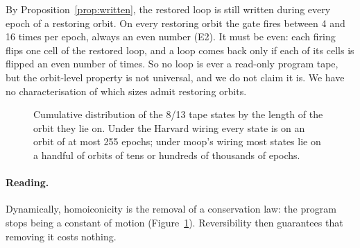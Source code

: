 \documentclass[11pt]{article}
\theoremstyle{definition}
\theoremstyle{remark}
\newcommand{\moop}{\textsf{moop}}
\begin{document}
By Proposition~\ref{prop:written}, the restored loop is still written
during every epoch of a restoring orbit. On every restoring orbit the gate
fires between 4 and 16 times per epoch, always an even number
(E2). It must be even: each firing flips one cell of the restored loop,
and a loop comes back only if each of its cells is flipped an even number
of times. So no loop is ever a read-only program tape, but the
orbit-level property is not universal, and we do not claim it is. We have
no characterisation of which sizes admit restoring orbits.

\begin{figure}[t]
\centering
{}
\caption{Cumulative distribution of the 8/13 tape states by the length
of the orbit they lie on. Under the Harvard wiring every state is on an
orbit of at most 255 epochs; under \moop{}'s wiring most states lie on a
handful of orbits of tens or hundreds of thousands of epochs.}
\label{fig:orbits}
\end{figure}

\paragraph{Reading.}
Dynamically, homoiconicity is the removal of a conservation law: the
program stops being a constant of motion (Figure~\ref{fig:orbits}).
Reversibility then guarantees that removing it costs nothing.
\end{document}
